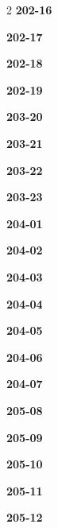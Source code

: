\documentclass[10pt,a4paper]{article}
\begin{document}
\begin{multicols}{2}
\noindent\textbf{202-16}\ \par
\noindent\textbf{202-17}\ \par
\noindent\textbf{202-18}\ \par
\noindent\textbf{202-19}\ \par
\noindent\textbf{203-20}\ \par
\noindent\textbf{203-21}\ \par
\noindent\textbf{203-22}\ \par
\noindent\textbf{203-23}\ \par
\noindent\textbf{204-01}\ \par
\noindent\textbf{204-02}\ \par
\noindent\textbf{204-03}\ \par
\noindent\textbf{204-04}\ \par
\noindent\textbf{204-05}\ \par
\noindent\textbf{204-06}\ \par
\noindent\textbf{204-07}\ \par
\noindent\textbf{205-08}\ \par
\noindent\textbf{205-09}\ \par
\noindent\textbf{205-10}\ \par
\noindent\textbf{205-11}\ \par
\noindent\textbf{205-12}\ \par
\end{multicols}
\end{document}
